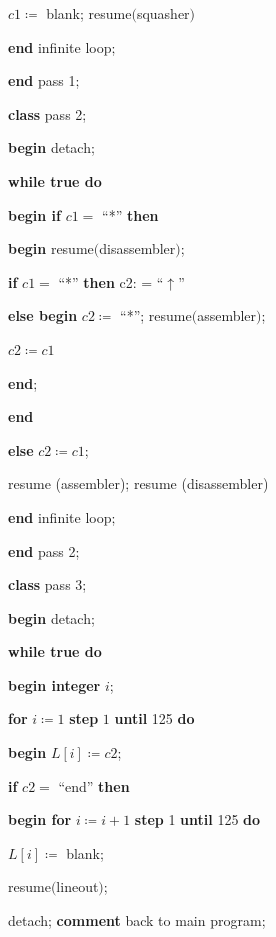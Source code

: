 \documentclass[twoside,11pt]{book}
\begin{document}
\quad \quad \quad \quad $c1\coloneq$ blank; resume$($squasher$)$

\quad \quad \quad \textbf{end} infinite loop;

\quad \textbf{end} pass 1;

\quad \textbf{class} pass 2;

\quad \textbf{begin} detach;

\quad \quad \textbf{while true do}

\quad \quad \quad \textbf{begin if} $c1 =$ ``*'' \textbf{then}

\quad \quad \quad \quad \textbf{begin} resume$($disassembler$)$;

\quad \quad \quad \quad \quad \textbf{if} $c1 =$ ``*'' \textbf{then} c2: = ``$\uparrow$''

\quad \quad \quad \quad \quad \textbf{else begin} $c2 \coloneq$ ``*''; resume$($assembler$)$;

\quad \quad \quad \quad \quad \quad $c2\coloneq c1$

\quad \quad \quad \quad \quad \textbf{end};

\quad \quad \quad \quad \textbf{end}

\quad \quad \quad \textbf{else} $c2\coloneq c1$;

\quad \quad \quad resume (assembler); resume (disassembler)

\quad \textbf{end} infinite loop;

\quad \textbf{end} pass 2;

\quad \textbf{class} pass 3;

\quad \textbf{begin} detach;

\quad \quad \textbf{while true do}

\quad \quad \quad \textbf{begin integer} $i$;

\quad \quad \quad \quad \textbf{for} $i\coloneq 1$ \textbf{step} $1$ \textbf{until} 125 \textbf{do}

\quad \quad \quad \quad \quad \textbf{begin} $L[i] \coloneq c2$;

\quad \quad \quad \quad \quad \quad \textbf{if} $c2 =$ ``end'' \textbf{then}

\quad \quad \quad \quad \quad \quad \textbf{begin for} $i\coloneq i + 1$ \textbf{step} 1 \textbf{until} 125 \textbf{do}

\quad \quad \quad \quad \quad \quad \quad $L[i] \coloneq$ blank;

\quad \quad \quad \quad \quad \quad \quad resume$($lineout$)$;

\quad \quad \quad \quad \quad \quad \quad detach; \textbf{comment} back to main program;
\end{document}
